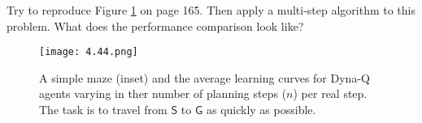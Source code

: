 
\begin{exercise}

Try to reproduce Figure \ref{fig:8.2} on page 165.
Then apply a multi-step algorithm to this problem.
What does the performance comparison look like?

\setcounter{section}{8}
\setcounter{figure}{1}

\begin{figure}[H]
    \centering
    \texttt{[image: 4.44.png]}
    \caption
    {
        A simple maze (inset) and the average learning curves for Dyna-Q agents varying in ther number of planning steps ($n$) per real step.
        The task is to travel from $\mathsf S$ to $\mathsf G$ as quickly as possible.
    }
    \label{fig:8.2}
\end{figure}

\end{exercise}


\begin{solution}

\phantom{}

\end{solution}

